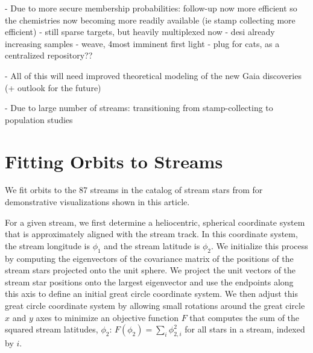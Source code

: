 \documentclass[final,5p,times,twocolumn,authoryear]{elsarticle}
\begin{document}
- Due to more secure membership probabilities: follow-up now more efficient so the chemistries now becoming more readily available (ie stamp collecting more efficient)
- still sparse targets, but heavily multiplexed now
- desi already increasing samples
- weave, 4most imminent first light
- plug for cats, as a centralized repository??

- All of this will need improved theoretical modeling of the new Gaia discoveries (+ outlook for the future)


- Due to large number of streams: transitioning from stamp-collecting to population studies

\appendix

\section{Fitting Orbits to Streams}
\label{apx:stream-fit}

%

We fit orbits to the 87 streams in the catalog of stream stars from \citet{ibata:TODO}
for demonstrative visualizations shown in this article.

For a given stream, we first determine a heliocentric, spherical coordinate system that
is approximately aligned with the stream track.
In this coordinate system, the stream longitude is $\phi_1$ and the stream latitude is
$\phi_2$.
We initialize this process by computing the eigenvectors of the covariance matrix of the
positions of the stream stars projected onto the unit sphere.
We project the unit vectors of the stream star positions onto the largest eigenvector
and use the endpoints along this axis to define an initial great circle coordinate
system.
We then adjust this great circle coordinate system by allowing small rotations around
the great circle $x$ and $y$ axes to minimize an objective function $F$ that computes
the sum of the squared stream latitudes, $\phi_2$: $F(\phi_2) = \sum_i \phi_{2,i}^2$ for
all stars in a stream, indexed by $i$.
\end{document}
